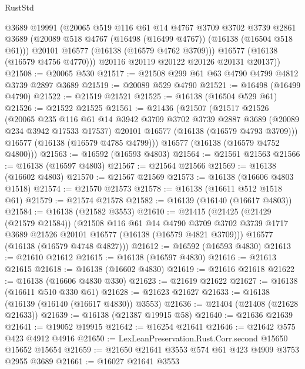 \begin{lexlean}{RustStd}
\begin{coremodule}
          @3689
          @19991
          (@20065
            @519
            @116
            @61
            @14
            @4767
            @3709
            @3702
            @3739
            @2861
            @3689
            (@20089 @518 @4767 (@16498 (@16499 @4767)) (@16138 (@16504 @518 @61)))
            @20101
            @16577
            (@16138 (@16579 @4762 @3709)))
          @16577
          (@16138 (@16579 @4756 @4770)))
        @20116
        @20119
        @20122
        @20126
        @20131
        @20137))
@21508 := @20065 @530
@21517 := @21508 @299 @61 @63 @4790 @4799 @4812 @3739 @2897 @3689
@21519 := @20089 @529 @4790
@21521 := @16498 (@16499 @4790)
@21522 := @21519 @21521
@21525 := @16138 (@16504 @529 @61)
@21526 := @21522 @21525
@21561 := @21436
    (@21507
      (@21517
        @21526
        (@20065
          @235
          @116
          @61
          @14
          @3942
          @3709
          @3702
          @3739
          @2887
          @3689
          (@20089 @234 @3942 @17533 @17537)
          @20101
          @16577
          (@16138 (@16579 @4793 @3709)))
        @16577
        (@16138 (@16579 @4785 @4799)))
      @16577
      (@16138 (@16579 @4752 @4800)))
@21563 := @16592 (@16593 @4803)
@21564 := @21561 @21563
@21566 := @16138 (@16597 @4803)
@21567 := @21564 @21566
@21569 := @16138 (@16602 @4803)
@21570 := @21567 @21569
@21573 := @16138 (@16606 @4803 @1518)
@21574 := @21570 @21573
@21578 := @16138 (@16611 @512 @1518 @61)
@21579 := @21574 @21578
@21582 := @16139 (@16140 (@16617 @4803))
@21584 := @16138 (@21582 @3553)
@21610 := @21415
    (@21425
      (@21429 (@21579 @21584))
      (@21508
        @116
        @61
        @14
        @4790
        @3709
        @3702
        @3739
        @1717
        @3689
        @21526
        @20101
        @16577
        (@16138 (@16579 @4821 @3709)))
      @16577
      (@16138 (@16579 @4748 @4827)))
@21612 := @16592 (@16593 @4830)
@21613 := @21610 @21612
@21615 := @16138 (@16597 @4830)
@21616 := @21613 @21615
@21618 := @16138 (@16602 @4830)
@21619 := @21616 @21618
@21622 := @16138 (@16606 @4830 @330)
@21623 := @21619 @21622
@21627 := @16138 (@16611 @510 @330 @61)
@21628 := @21623 @21627
@21633 := @16138 (@16139 (@16140 (@16617 @4830)) @3553)
@21636 := @21404 (@21408 (@21628 @21633))
@21639 := @16138 (@21387 @19915 @58)
@21640 := @21636 @21639
@21641 := @19052 @19915
@21642 := @16254 @21641
@21646 := @21642 @575 @423 @4912 @4916
@21650 := LexLeanPreservation.Rust.Corr.second @15650 @15652 @15654
@21659 := @21650 @21641 @3553 @574 @61 @423 @4909 @3753 @2955 @3689
@21661 := @16027 @21641 @3553

\end{coremodule}
\end{lexlean}

